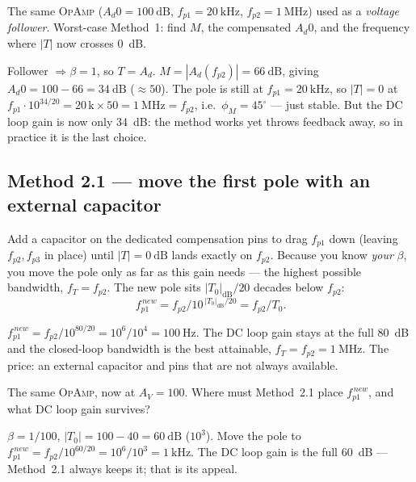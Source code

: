\documentclass[11pt,a4paper,oneside]{book}
\newcommand{\Ad}{A_d}
\newcommand{\op}{\textsc{OpAmp}}
\begin{document}
\begin{exercise}
The same \op{} ($\Ad0=\qty{100}{\dB}$, $f_{p1}=\qty{20}{\kilo\hertz}$,
$f_{p2}=\qty{1}{\mega\hertz}$) used as a \emph{voltage follower}. Worst-case
Method~1: find $M$, the compensated $\Ad0$, and the frequency where $|T|$ now
crosses \qty{0}{\dB}.
\end{exercise}
\begin{solution}
Follower $\Rightarrow\beta=1$, so $T=\Ad$. $M=|\Ad(f_{p2})|=\qty{66}{\dB}$, giving
$\Ad0=100-66=\qty{34}{\dB}$ ($\approx50$). The pole is still at
$f_{p1}=\qty{20}{\kilo\hertz}$, so $|T|=0$ at
$f_{p1}\cdot10^{34/20}=20\,\text{k}\times50=\qty{1}{\mega\hertz}=f_{p2}$, i.e.\
$\phi_M=45^\circ$ --- just stable. But the DC loop gain is now only \qty{34}{\dB}:
the method works yet throws feedback away, so in practice it is the last choice.
\end{solution}

\subsection{Method 2.1 --- move the first pole with an external capacitor}
Add a capacitor on the dedicated compensation pins to drag $f_{p1}$ down (leaving
$f_{p2},f_{p3}$ in place) until $|T|=\qty{0}{\dB}$ lands exactly on $f_{p2}$.
Because you know \emph{your} $\beta$, you move the pole only as far as this gain
needs --- the highest possible bandwidth, $f_T=f_{p2}$. The new pole sits
$|T_0|_{\mathrm{dB}}/20$ decades below $f_{p2}$:
\[
  f_{p1}^{\,new}=f_{p2}\big/10^{\,|T_0|_{\mathrm{dB}}/20}=f_{p2}/T_0 .
\]

\begin{wexample}
$f_{p1}^{\,new}=f_{p2}/10^{80/20}=10^{6}/10^{4}=\qty{100}{\hertz}$. The DC loop
gain stays at the full \qty{80}{\dB} and the closed-loop bandwidth is the best
attainable, $f_T=f_{p2}=\qty{1}{\mega\hertz}$. The price: an external capacitor
and pins that are not always available.
\end{wexample}

\begin{exercise}
The same \op{}, now at $A_V=100$. Where must Method~2.1 place $f_{p1}^{\,new}$,
and what DC loop gain survives?
\end{exercise}
\begin{solution}
$\beta=1/100$, $|T_0|=100-40=\qty{60}{\dB}$ ($10^{3}$). Move the pole to
$f_{p1}^{\,new}=f_{p2}/10^{60/20}=10^{6}/10^{3}=\qty{1}{\kilo\hertz}$. The DC loop
gain is the full \qty{60}{\dB} --- Method~2.1 always keeps it; that is its appeal.
\end{solution}
\end{document}
